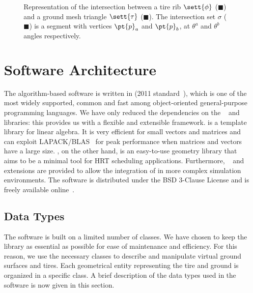 \begin{figure}[htb]
  \centering
  \def\svgwidth{0.5\textwidth}
  
  \caption{Representation of the intersection between a tire rib $\sett{\phi}$ (\textcolor[RGB]{255, 231, 187}{$\blacksquare$}) and a ground mesh triangle $\sett{\tau}$ (\textcolor[RGB]{255, 218, 217}{$\blacksquare$}). The intersection set $\sigma$ (\textcolor[RGB]{74, 181, 99}{$\blacksquare$}) is a segment with
  vertices $\pt{p}_a$ and $\pt{p}_b$, at $\theta^a$ and $\theta^b$ angles respectively.}
  \label{app2:fig:intersection}
\end{figure}


\section{Software Architecture}
\label{app2:sec:software_architecture}

The \Enve{} algorithm-based software is written in \cpp{} (2011 standard~\cite{stroustrup2013cpp}), which is one of the most widely supported, common and fast among object-oriented general-purpose programming languages. We have only reduced the dependencies on the \Eigen{}~\cite{eigen2010eigen} and \Acme{}~\cite{stocco2021acme} libraries: this provides us with a flexible and extensible framework. \Eigen{} is a template library for linear algebra. It is very efficient for small vectors and matrices and can exploit \ac{LAPACK}/\ac{BLAS}~\cite{anderson1999lapack} for peak performance when matrices and vectors have a large size. \Acme{}, on the other hand, is an easy-to-use geometry library that aims to be a minimal tool for \ac{HRT} scheduling applications. Furthermore, \Matlab{}~\Mex{} and \Simulink{}~\SFunction{} extensions are provided to allow the integration of \Enve{} in more complex simulation environments. The software is distributed under the BSD 3-Clause License and is freely available online~\cite{enve}.

\subsection{Data Types}
\label{app2:sec:data_types}

The software is built on a limited number of classes. We have chosen to keep the library as essential as possible for ease of maintenance and efficiency. For this reason, we use the necessary classes to describe and manipulate virtual ground surfaces and tires. Each geometrical entity representing the tire and ground is organized in a specific class. A brief description of the data types used in the software is now given in this section.

